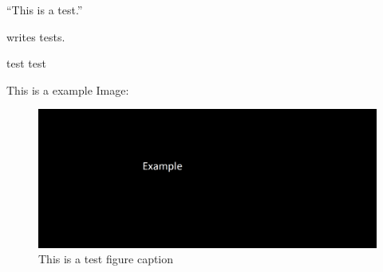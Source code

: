 
\enquote{This is a test.} \parencite{test}

\textcite{test} writes tests.

test test

This is a example Image:

\begin{figure}
    \centering
    \includegraphics[width=0.7 \linewidth]{images/Example.png}
    \caption{This is a test figure caption}
\end{figure}
